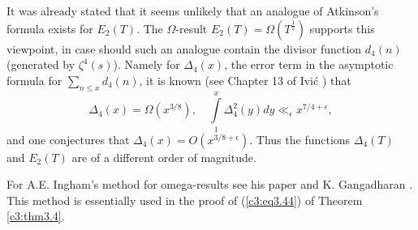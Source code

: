 It was already stated that it seems unlikely that an analogue of
Atkinson's formula exists for $E_2(T)$. The $\Omega$-result $E_2(T) =
\Omega (T^{\frac{1}{2}})$ supports this viewpoint, in case should such
an analogue contain the divisor function $d_4(n)$ (generated by
$\zeta^4(s)$). Namely for $\Delta_4 (x)$, the error term in the
asymptotic formula for $\sum\limits_{n \leq x} d_4(n)$, it is known
(see Chapter 13 of Ivi\'c \cite{Ivic1}) that  
$$
\Delta_4(x) = \Omega (x^{3/8}), \quad \int\limits^x_1 \Delta^2_4(y) dy
\ll_{\epsilon} x^{7/4 + \epsilon}, 
$$
and one conjectures that $\Delta_4 (x) = O (x^{3/8+\epsilon})$. Thus
the functions $\Delta_4 (T)$ and $E_2(T)$ are of a different order of
magnitude. 

For A.E. Ingham's method for omega-results see his paper
\cite{Ingham1} and K. Gangadharan \cite{Gangadharan1}. This method is
essentially used in the proof of (\ref{c3:eq3.44}) of Theorem
\ref{c3:thm3.4}. 

